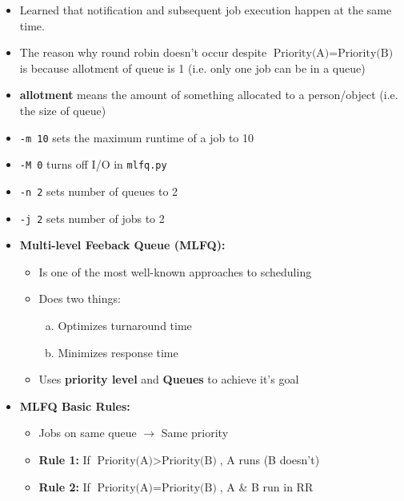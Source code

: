 \documentclass[12pt]{article}
\begin{document}
\begin{enumerate}[1.]
\begin{itemize}
        \item Learned that notification and subsequent job execution happen at the same time.
        \item The reason why round robin doesn't occur despite $\text{Priority(A)} = \text{Priority(B)}$
        is because allotment of queue is 1 (i.e. only one job can be in a queue)
        \item \textbf{allotment} means the amount of something allocated to a person/object (i.e. the size of queue)
        \item \texttt{-m 10} sets the maximum runtime of a job to 10
        \item \texttt{-M 0} turns off I/O in \texttt{mlfq.py}
        \item \texttt{-n 2} sets number of queues to 2
        \item \texttt{-j 2} sets number of jobs to 2

        \item \textbf{Multi-level Feeback Queue (MLFQ):}

        \begin{itemize}
            \item Is one of the most well-known approaches to scheduling
            \item Does two things:

            \begin{enumerate}[a)]
                \item Optimizes turnaround time
                \item Minimizes response time
            \end{enumerate}

            \item Uses \textbf{priority level} and \textbf{Queues} to achieve it's goal
        \end{itemize}

        \item \textbf{MLFQ Basic Rules:}
        \begin{itemize}
            \item Jobs on same queue $\to$ Same priority
            \item \textbf{Rule 1:} If $\text{Priority(A)} > \text{Priority(B)}$, A runs (B doesn't)
            \item \textbf{Rule 2:} If $\text{Priority(A)} = \text{Priority(B)}$, A \& B run in RR
        \end{itemize}

        \bigskip


\end{itemize}
\end{enumerate}
\end{document}
